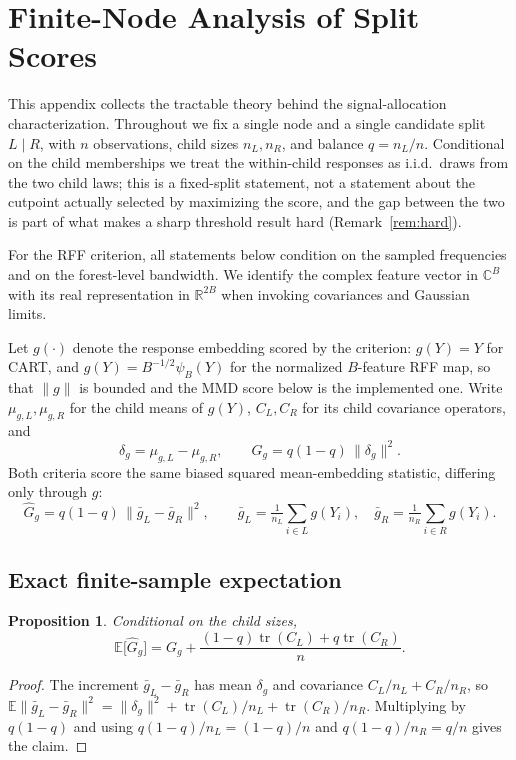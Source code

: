 \documentclass[11pt]{article}
\newtheorem{proposition}{Proposition}
\theoremstyle{remark}
\begin{document}
\appendix
\section{Finite-Node Analysis of Split Scores}
\label{app:finite}

This appendix collects the tractable theory behind the signal-allocation
characterization.  Throughout we fix a single node and a single candidate split
$L \mid R$, with $n$ observations, child sizes $n_L,n_R$, and balance
$q = n_L/n$.  Conditional on the child memberships we treat the within-child
responses as i.i.d.\ draws from the two child laws; this is a fixed-split
statement, not a statement about the cutpoint actually selected by maximizing the
score, and the gap between the two is part of what makes a sharp threshold
result hard (Remark~\ref{rem:hard}).

For the RFF criterion, all statements below condition on the sampled frequencies
and on the forest-level bandwidth.  We identify the complex feature vector in
$\mathbb C^B$ with its real representation in $\mathbb R^{2B}$ when invoking
covariances and Gaussian limits.

Let $g(\cdot)$ denote the response embedding scored by the criterion: $g(Y)=Y$
for CART, and $g(Y)=B^{-1/2}\psi_B(Y)$ for the normalized $B$-feature RFF map, so
that $\|g\|$ is bounded and the MMD score below is the implemented one.  Write
$\mu_{g,L},\mu_{g,R}$ for the child means of $g(Y)$, $C_L,C_R$ for its child
covariance operators, and
\[
  \delta_g = \mu_{g,L}-\mu_{g,R},
  \qquad
  G_g = q(1-q)\,\|\delta_g\|^2 .
\]
Both criteria score the same biased squared mean-embedding statistic, differing
only through $g$:
\[
  \widehat G_g = q(1-q)\,\bigl\|\bar g_L - \bar g_R\bigr\|^2,
  \qquad
  \bar g_L = \tfrac{1}{n_L}\!\sum_{i\in L} g(Y_i),\quad
  \bar g_R = \tfrac{1}{n_R}\!\sum_{i\in R} g(Y_i).
\]

\subsection{Exact finite-sample expectation}

\begin{proposition}\label{prop:exp}
Conditional on the child sizes,
\[
  \mathbb E\bigl[\widehat G_g\bigr]
  = G_g
  + \frac{(1-q)\operatorname{tr}(C_L) + q\operatorname{tr}(C_R)}{n} .
\]
\end{proposition}

\begin{proof}
The increment $\bar g_L-\bar g_R$ has mean $\delta_g$ and covariance
$C_L/n_L + C_R/n_R$, so
$\mathbb E\|\bar g_L-\bar g_R\|^2 = \|\delta_g\|^2 + \operatorname{tr}(C_L)/n_L +
\operatorname{tr}(C_R)/n_R$.  Multiplying by $q(1-q)$ and using
$q(1-q)/n_L=(1-q)/n$ and $q(1-q)/n_R=q/n$ gives the claim.
\end{proof}
\end{document}
